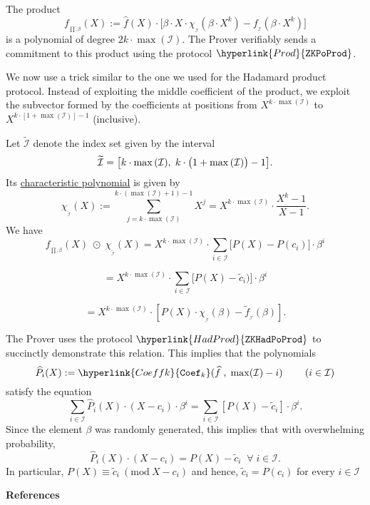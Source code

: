 \documentclass[11pt, lettersize, notitlepage, leqno, footskip=0.6cm]{article}
\newcommand{\wti}{\widetilde}
\newcommand{\mc}{\mathcal}
\newcommand{\be}{\beta}
\newcommand{\what}{\widehat}
\newcommand{\vs}{\vspace{-0.15cm}}
\newcommand{\noin}{\noindent}
\newcommand{\op}{overwhelming probability}
\newcommand{\Mod}[1]{\ (\mathrm{mod}\ #1)}
\numberwithin{equation}{section}
\begin{document}
The product  $$ f_{_{\prod,\be}}(X):= \what{f}(X) \cdot \big[\be\cdot X\cdot \chi_{_{\mc{I}}}(\be\cdot X^k) - f_{_{\mc{I}}}(\be\cdot X^k)\big] $$ is a polynomial of degree $2k\cdot \max{(\mc{I})}$. The Prover verifiably sends a commitment to this product using the protocol $\hyperlink{Prod}{\tt{ZKPoProd}}$. 

We now use a trick similar to the one we used for the Hadamard product protocol. Instead of exploiting the middle coefficient of the product, we exploit the subvector formed by the coefficients at positions from $X^{k\cdot \max(\mc{I})}$ to $X^{k\cdot [1+\max{(\mc{I})}]-1}$ (inclusive). 

Let $\wti{\mc{I}}$ denote the index set given by the interval \vs $$\wti{\mc{I}}= \big[k\cdot \max{(\mc{I})},\;k\cdot \big(1+\max{(\mc{I})}\big)-1 \big] .\vs $$ Its \hyperlink{charpoly}{characteristic polynomial} is given by \vs $$\chi_{_{\wti{\mc{I}}}}(X):= \sum\limits_{j = k\cdot \max(\mc{I})}^{k\cdot (\max(\mc{I})+1)-1} X^{j} = X^{k\cdot \max(\mc{I})}\cdot \frac{X^{k}-1}{X-1}.$$ We have \[ f_{_{\prod,\be}}(X)\;\odot\; \chi_{_{\wti{\mc{I}}}}(X) =  X^{k\cdot \max{(\mc{I})}}\cdot \sum\limits_{i\in \mc{I}} \big[P(X)-P(c_i)\big]\cdot \be^i \] 

\vspace{-3mm} \[ = X^{k\cdot \max{(\mc{I})}}\cdot \sum\limits_{i\in \mc{I}} \big[P(X)-\wti{c}_i)\big]\cdot \be^i\]

\vspace{-3mm} \[ = X^{k\cdot \max{(\mc{I})}} \cdot [P(X)\cdot \chi_{_{\mc{I}}}(\be)- \wti{f}_{_{\mc{I}}}(\be)].\]

\noin The Prover uses the protocol $\hyperlink{HadProd}{\tt{ZKHadPoProd}}$ to succinctly demonstrate this relation. This implies that the polynomials \vs $$ \what{P}_i(X):= \hyperlink{Coeffk}{{\tt{Coef}}_k}(\what{f}\;,\;\max(\mc{I})- i)\;\;\;\;\;\;\;\;(i\in\mc{I}) \vs $$ satisfy the equation $$\sum\limits_{i\in\mc{I}} \what{P}_i(X)\cdot (X-c_i)\cdot \be^i = \sum\limits_{i\in \mc{I}} [P(X)-\wti{c}_i]\cdot \be^i. $$ Since the element $\be$ was randomly generated, this implies that with \op, \vs $$ \what{P}_i(X)\cdot (X-c_i)  = P(X)- \wti{c}_i\;\;\forall\;i\in \mc{I}.$$ In particular, $P(X)\equiv \wti{c}_i\Mod{X-c_i}$ and hence, $\wti{c}_i = P(c_i)$ for every $i\in \mc{I}$ 


\newpage 






\begin{center}\textbf{References}\end{center}
\end{document}
